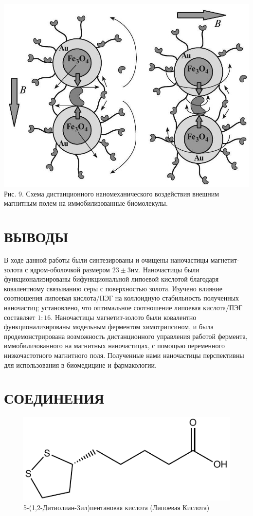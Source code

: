 \documentclass[10pt, a4paper]{article}
\begin{document}
  \includegraphics[scale=0.5, center]{2024_10_23_dfdc0589534473f41785g-8}
  Рис. 9. Схема дистанционного наномеханического воздействия внешним магнитным полем на иммобилизованные биомолекулы.
  
\section*{ВЫВОДЫ}
  В ходе данной работы были синтезированы и очищены наночастицы магнетит-золота с ядром-оболочкой размером \(23 \pm 3 \text{нм}\). Наночастицы были функционализированы бифункциональной липоевой кислотой благодаря ковалентному связыванию серы с поверхностью золота. 
  Изучено влияние соотношения липоевая кислота/ПЭГ на коллоидную стабильность полученных наночастиц; установлено, что оптимальное соотношение липоевая кислота/ПЭГ составляет \(1: 16\). Наночастицы магнетит-золото были ковалентно функционализированы модельным ферментом химотрипсином, 
  и была продемонстрирована возможность дистанционного управления работой фермента, иммобилизованного на магнитных наночастицах, с помощью переменного низкочастотного магнитного поля. Полученные нами наночастицы перспективны для использования в биомедицине и фармакологии.
\section*{СОЕДИНЕНИЯ}

\begin{figure}[ht!]
  \centering
  \includegraphics[scale=1]{lipoic.pdf}
  \captionsetup{labelformat=empty}
  \caption{5-(1,2-Дитиолиан-3ил)пентановая кислота (Липоевая Кислота)}
\end{figure}
\end{document}

